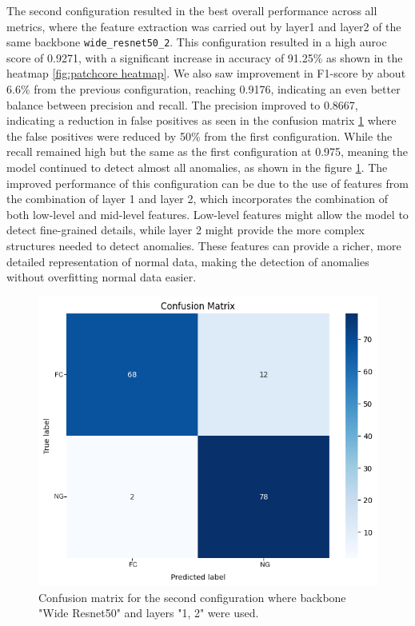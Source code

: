 The second configuration resulted in the best overall performance across all metrics, where the feature extraction was carried out by layer1 and layer2 of the same backbone \texttt{wide\_resnet50\_2}. This configuration resulted in a high \gls{auroc} score of 0.9271, with a significant increase in accuracy of 91.25\% as shown in the heatmap \ref{fig:patchcore heatmap}. We also saw improvement in F1-score by about 6.6\% from the previous configuration, reaching 0.9176, indicating an even better balance between precision and recall. The precision improved to 0.8667, indicating a reduction in false positives as seen in the confusion matrix \ref{fig:patchcore config2 confusion matrix} where the false positives were reduced by 50\% from the first configuration. While the recall remained high but the same as the first configuration at 0.975, meaning the model continued to detect almost all anomalies, as shown in the figure \ref{fig:patchcore config2 confusion matrix}. The improved performance of this configuration can be due to the use of features from the combination of layer 1 and layer 2, which incorporates the combination of both low-level and mid-level features. Low-level features might allow the model to detect fine-grained details, while layer 2 might provide the more complex structures needed to detect anomalies. These features can provide a richer, more detailed representation of normal data, making the detection of anomalies without overfitting normal data easier.

\begin{figure}[ht!]
    \centering
    \includegraphics[width=1\linewidth]{Rohit_Master_Thesis//Images/patchcore_config2_confusion_matrix.png}
    \caption{Confusion matrix for the second configuration where backbone "Wide Resnet50" and layers "1, 2" were used.}
    \label{fig:patchcore config2 confusion matrix}
\end{figure}

